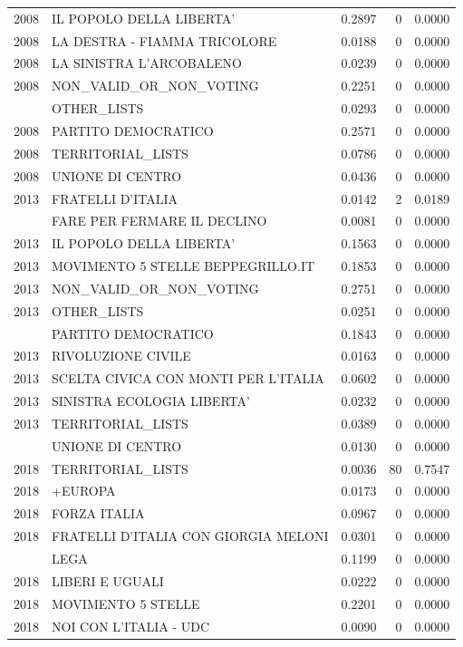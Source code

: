 \begin{longtable}[t]{rlrrr}
2008 & IL POPOLO DELLA LIBERTA' & 0.2897 & 0 & 0.0000\\
2008 & LA DESTRA - FIAMMA TRICOLORE & 0.0188 & 0 & 0.0000\\
2008 & LA SINISTRA L'ARCOBALENO & 0.0239 & 0 & 0.0000\\
2008 & NON\_VALID\_OR\_NON\_VOTING & 0.2251 & 0 & 0.0000\\
\addlinespace
2008 & OTHER\_LISTS & 0.0293 & 0 & 0.0000\\
2008 & PARTITO DEMOCRATICO & 0.2571 & 0 & 0.0000\\
2008 & TERRITORIAL\_LISTS & 0.0786 & 0 & 0.0000\\
2008 & UNIONE DI CENTRO & 0.0436 & 0 & 0.0000\\
2013 & FRATELLI D'ITALIA & 0.0142 & 2 & 0.0189\\
\addlinespace
2013 & FARE PER FERMARE IL DECLINO & 0.0081 & 0 & 0.0000\\
2013 & IL POPOLO DELLA LIBERTA' & 0.1563 & 0 & 0.0000\\
2013 & MOVIMENTO 5 STELLE BEPPEGRILLO.IT & 0.1853 & 0 & 0.0000\\
2013 & NON\_VALID\_OR\_NON\_VOTING & 0.2751 & 0 & 0.0000\\
2013 & OTHER\_LISTS & 0.0251 & 0 & 0.0000\\
\addlinespace
2013 & PARTITO DEMOCRATICO & 0.1843 & 0 & 0.0000\\
2013 & RIVOLUZIONE CIVILE & 0.0163 & 0 & 0.0000\\
2013 & SCELTA CIVICA CON MONTI PER L'ITALIA & 0.0602 & 0 & 0.0000\\
2013 & SINISTRA ECOLOGIA LIBERTA' & 0.0232 & 0 & 0.0000\\
2013 & TERRITORIAL\_LISTS & 0.0389 & 0 & 0.0000\\
\addlinespace
2013 & UNIONE DI CENTRO & 0.0130 & 0 & 0.0000\\
2018 & TERRITORIAL\_LISTS & 0.0036 & 80 & 0.7547\\
2018 & +EUROPA & 0.0173 & 0 & 0.0000\\
2018 & FORZA ITALIA & 0.0967 & 0 & 0.0000\\
2018 & FRATELLI D'ITALIA CON GIORGIA MELONI & 0.0301 & 0 & 0.0000\\
\addlinespace
2018 & LEGA & 0.1199 & 0 & 0.0000\\
2018 & LIBERI E UGUALI & 0.0222 & 0 & 0.0000\\
2018 & MOVIMENTO 5 STELLE & 0.2201 & 0 & 0.0000\\
2018 & NOI CON L'ITALIA - UDC & 0.0090 & 0 & 0.0000\\

\end{longtable}
